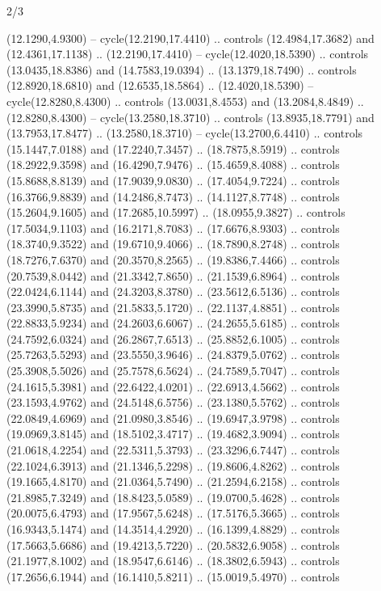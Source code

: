 \begin{flagdescription}{2/3}
\begin{scope}[yshift=\flagwidth,scale=\flagwidth/1241.93737]
\begin{scope}[y=-1mm, x=1mm,draw=gold,fill=blue,line join=miter,miter limit=4,line width=1.8\lw]
\begin{scope}[y=1mm, x=1mm, yscale=-1,shift={(573.68mm+\str,145.75)}]
\begin{scope}[scale=1.35,shift={(-9,-3)}]
\begin{scope}[scale=0.55]
\begin{scope}[scale=1.333]
    (12.1290,4.9300) -- cycle(12.2190,17.4410) .. controls (12.4984,17.3682) and
    (12.4361,17.1138) .. (12.2190,17.4410) -- cycle(12.4020,18.5390) .. controls
    (13.0435,18.8386) and (14.7583,19.0394) .. (13.1379,18.7490) .. controls
    (12.8920,18.6810) and (12.6535,18.5864) .. (12.4020,18.5390) --
    cycle(12.8280,8.4300) .. controls (13.0031,8.4553) and (13.2084,8.4849) ..
    (12.8280,8.4300) -- cycle(13.2580,18.3710) .. controls (13.8935,18.7791) and
    (13.7953,17.8477) .. (13.2580,18.3710) -- cycle(13.2700,6.4410) .. controls
    (15.1447,7.0188) and (17.2240,7.3457) .. (18.7875,8.5919) .. controls
    (18.2922,9.3598) and (16.4290,7.9476) .. (15.4659,8.4088) .. controls
    (15.8688,8.8139) and (17.9039,9.0830) .. (17.4054,9.7224) .. controls
    (16.3766,9.8839) and (14.2486,8.7473) .. (14.1127,8.7748) .. controls
    (15.2604,9.1605) and (17.2685,10.5997) .. (18.0955,9.3827) .. controls
    (17.5034,9.1103) and (16.2171,8.7083) .. (17.6676,8.9303) .. controls
    (18.3740,9.3522) and (19.6710,9.4066) .. (18.7890,8.2748) .. controls
    (18.7276,7.6370) and (20.3570,8.2565) .. (19.8386,7.4466) .. controls
    (20.7539,8.0442) and (21.3342,7.8650) .. (21.1539,6.8964) .. controls
    (22.0424,6.1144) and (24.3203,8.3780) .. (23.5612,6.5136) .. controls
    (23.3990,5.8735) and (21.5833,5.1720) .. (22.1137,4.8851) .. controls
    (22.8833,5.9234) and (24.2603,6.6067) .. (24.2655,5.6185) .. controls
    (24.7592,6.0324) and (26.2867,7.6513) .. (25.8852,6.1005) .. controls
    (25.7263,5.5293) and (23.5550,3.9646) .. (24.8379,5.0762) .. controls
    (25.3908,5.5026) and (25.7578,6.5624) .. (24.7589,5.7047) .. controls
    (24.1615,5.3981) and (22.6422,4.0201) .. (22.6913,4.5662) .. controls
    (23.1593,4.9762) and (24.5148,6.5756) .. (23.1380,5.5762) .. controls
    (22.0849,4.6969) and (21.0980,3.8546) .. (19.6947,3.9798) .. controls
    (19.0969,3.8145) and (18.5102,3.4717) .. (19.4682,3.9094) .. controls
    (21.0618,4.2254) and (22.5311,5.3793) .. (23.3296,6.7447) .. controls
    (22.1024,6.3913) and (21.1346,5.2298) .. (19.8606,4.8262) .. controls
    (19.1665,4.8170) and (21.0364,5.7490) .. (21.2594,6.2158) .. controls
    (21.8985,7.3249) and (18.8423,5.0589) .. (19.0700,5.4628) .. controls
    (20.0075,6.4793) and (17.9567,5.6248) .. (17.5176,5.3665) .. controls
    (16.9343,5.1474) and (14.3514,4.2920) .. (16.1399,4.8829) .. controls
    (17.5663,5.6686) and (19.4213,5.7220) .. (20.5832,6.9058) .. controls
    (21.1977,8.1002) and (18.9547,6.6146) .. (18.3802,6.5943) .. controls
    (17.2656,6.1944) and (16.1410,5.8211) .. (15.0019,5.4970) .. controls

\end{scope}
\end{scope}
\end{scope}
\end{scope}
\end{scope}
\end{scope}
\end{flagdescription}
